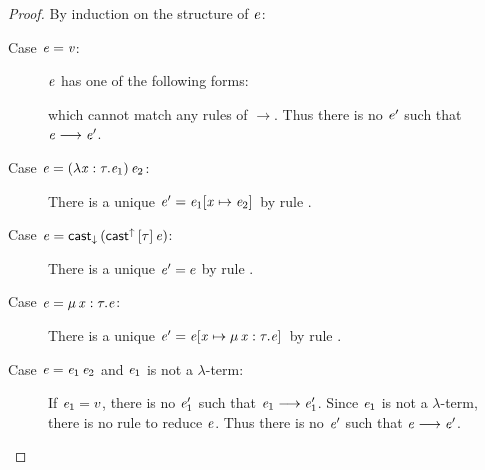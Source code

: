 \begin{proof}
	By induction on the structure of $\mathit{e}$:
	\begin{description}
		\item[Case $\mathit{e}  =  \mathit{v}$:] $\mathit{e}$ has one of the following forms:
		\begin{inparaenum}[(1)]
		    \item $\star$,
			\item $\lambda  \ottmv{x}  \ottsym{:}  \tau  \ottsym{.}  \ottnt{e}$,
			\item $\Pi \, \ottmv{x}  \ottsym{:}  \tau_{{\mathrm{1}}}  \ottsym{.}  \tau_{{\mathrm{2}}}$,
			\item $\mathsf{cast}^{\uparrow} \, \ottsym{[}  \tau  \ottsym{]} \,  \ottnt{e}$,
		\end{inparaenum}
		which cannot match any rules of $ \longrightarrow $. Thus there is no $\mathit{e}'$ such
that $\mathit{e}  \longrightarrow  \mathit{e'}$.
		\item[Case $\mathit{e}=(  \lambda  \mathit{x}  :  \tau  .  \mathit{e_{{\mathrm{1}}}}  ) \, \mathit{e_{{\mathrm{2}}}}$:] There is a unique $\mathit{e}'=\mathit{e_{{\mathrm{1}}}}  [  \mathit{x}  \mapsto  \mathit{e_{{\mathrm{2}}}}  ] \,$ by rule .
		\item[Case $\mathit{e}=\mathsf{cast}_{\downarrow} \, (  \mathsf{cast}^{\uparrow} \, [  \tau  ] \,  \mathit{e}  )$:] There is a unique $\mathit{e}'=e$
by rule .
		\item[Case $\mathit{e}=\mu \, \mathit{x}  :  \tau  .  \mathit{e}$:] There is a unique $\mathit{e}'=\mathit{e}  [  \mathit{x}  \mapsto  \mu \, \mathit{x}  :  \tau  .  \mathit{e}  ] \,$ by rule .
		\item[Case $\mathit{e}=\mathit{e_{{\mathrm{1}}}} \, \mathit{e_{{\mathrm{2}}}}$ and $\mathit{e_{{\mathrm{1}}}}$ is not a $\lambda$-term:] If
$\mathit{e_{{\mathrm{1}}}}=v$, there is no $\mathit{e'_{{\mathrm{1}}}}$ such that $\mathit{e_{{\mathrm{1}}}}  \longrightarrow  \mathit{e'_{{\mathrm{1}}}}$. Since $\mathit{e_{{\mathrm{1}}}}$ is
not a $\lambda$-term, there is no rule to reduce $\mathit{e}$. Thus there is no
$\mathit{e}'$ such that $\mathit{e}  \longrightarrow  \mathit{e'}$.
		

\end{description}
\end{proof}
